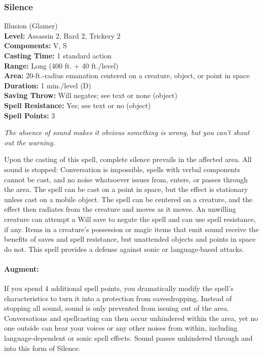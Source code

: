 \subsubsection{Silence}
\label{Spell:Silence}
Illusion (Glamer)
\\ \textbf{Level:} Assassin 2, Bard 2, Trickery 2
\\ \textbf{Components:} V, S
\\ \textbf{Casting Time:} 1 standard action
\\ \textbf{Range:} Long (400 ft. + 40 ft./level)
\\ \textbf{Area:} 20-ft.-radius emanation centered on a creature, object, or point in space
\\ \textbf{Duration:} 1 min./level (D)
\\ \textbf{Saving Throw:} Will negates; see text or none (object)
\\ \textbf{Spell Resistance:} Yes; see text or no (object)
\\ \textbf{Spell Points:} 3

\emph{The absence of sound makes it obvious something is wrong, but you can't shout out the warning.}

Upon the casting of this spell, complete silence prevails in the affected area. 
All sound is stopped: Conversation is impossible, spells with verbal components cannot be cast, and no noise whatsoever issues from, enters, or passes through the area. 
The spell can be cast on a point in space, but the effect is stationary unless cast on a mobile object. 
The spell can be centered on a creature, and the effect then radiates from the creature and moves as it moves. 
An unwilling creature can attempt a Will save to negate the spell and can use spell resistance, if any. 
Items in a creature's possession or magic items that emit sound receive the benefits of saves and spell resistance, but unattended objects and points in space do not. 
This spell provides a defense against sonic or language-based attacks.

\paragraph{Augment:} If you spend 4 additional spell points, you dramatically modify the spell's characteristics to turn it into a protection from eavesdropping.
 Instead of stopping all sound, sound is only prevented from issuing out of the area. Conversations and spellcasting can then occur unhindered within the area, yet no one outside can hear your voices or any other noises from within, including language-dependent or sonic spell effects. Sound passes unhindered through and into this form of Silence.
